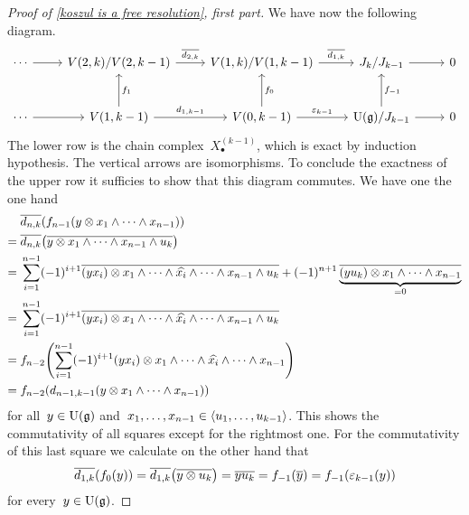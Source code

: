 \begin{proof}[Proof of \cref{koszul is a free resolution}, first part]
	We have now the following diagram.
	\[
		\begin{tikzcd}[row sep = large]
			\dotsb
			\arrow{r}
			&
			V(2, k) / V(2, k-1)
			\arrow{r}[above]{\induced{d_{2,k}}}
			&
			V(1, k) / V(1, k-1)
			\arrow{r}[above]{\induced{d_{1,k}}}
			&
			J_k / J_{k-1}
			\arrow{r}
			&
			0
			\\
			\dotsb
			\arrow{r}
			&
			V(1,k-1)
			\arrow{u}[right]{f_1}
			\arrow{r}[above]{d_{1,k-1}}
			&
			V(0,k-1)
			\arrow{u}[right]{f_0}
			\arrow{r}[above]{\varepsilon_{k-1}}
			&
			\Univ(\glie) / J_{k-1}
			\arrow{u}[right]{f_{-1}}
			\arrow{r}
			&
			0
		\end{tikzcd}
	\]
	The lower row is the chain complex~$X^{(k-1)}_\bullet$, which is exact by induction hypothesis.
	The vertical arrows are isomorphisms.
	To conclude the exactness of the upper row it sufficies to show that this diagram commutes.
	We have one the one hand
	\begin{align*}
		{}&
		\overline{d_{n,k}}( f_{n-1}( y \otimes x_1 \wedge \dotsb \wedge x_{n-1} ) )
		\\
		={}&
		\overline{d_{n,k}}\bigl( \overline{ y \otimes x_1 \wedge \dotsb \wedge x_{n-1} \wedge u_k} \bigr)
		\\
		={}&
		\sum_{i=1}^{n-1}
		(-1)^{i+1} \overline{ (y x_i) \otimes x_1 \wedge \dotsb \wedge \widehat{x_i} \wedge \dotsb \wedge x_{n-1} \wedge u_k }
		+ (-1)^{n+1} \underbrace{ \overline{ (y u_k) \otimes x_1 \wedge \dotsb \wedge x_{n-1} } }_{=0}
		\\
		={}&
		\sum_{i=1}^{n-1}
		(-1)^{i+1} \overline{ (y x_i) \otimes x_1 \wedge \dotsb \wedge \widehat{x_i} \wedge \dotsb \wedge x_{n-1} \wedge u_k }
		\\
		={}&
		f_{n-2}
		\Biggl(
			\sum_{i=1}^{n-1}
			(-1)^{i+1}
			(y x_i) \otimes x_1 \wedge \dotsb \wedge \widehat{x_i} \wedge \dotsb \wedge x_{n-1}
		\Biggr)
		\\
		={}&
		f_{n-2}( d_{n-1,k-1}( y \otimes x_1 \wedge \dotsb \wedge x_{n-1} ) )
	\end{align*}
	for all~$y \in \operatorname{U}(\mathfrak{g})$ and~$x_1, \dotsc, x_{n-1} \in \langle u_1, \dotsc, u_{k-1}\rangle$.
	This shows the commutativity of all squares except for the rightmost one.
	For the commutativity of this last square we calculate on the other hand that
	\[
		\overline{d_{1,k}}( f_0( y ) )
		=
		\overline{d_{1,k}}\bigl( \overline{ y \otimes u_k } \bigr)
		=
		\overline{ y u_k }
		=
		f_{-1}( \overline{y} )
		=
		f_{-1}( \varepsilon_{k-1}( y ) )
	\]
	for every~$y \in \operatorname{U}(\mathfrak{g})$.
\end{proof}


